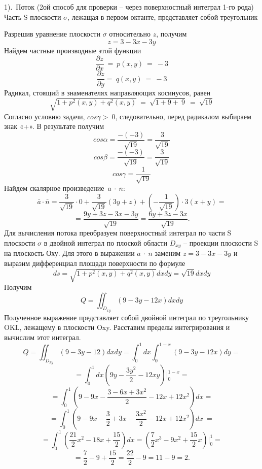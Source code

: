 \documentclass[11pt]{article}
\begin{document}
 
\pagestyle{empty}
1).\ Поток (2ой способ для проверки – через поверхностный интеграл 1-го рода)
Часть S плоскости $\sigma$, лежащая в первом октанте, представляет собой треугольник \\


Разрешив уравнение плоскости $\sigma$ относительно $z$, получим 
$$z=3 - 3x - 3y$$
Найдем частные производные этой функции
$$\frac{\partial z}{\partial x}\ =\ p(x,y)\ =\ -3$$
$$\frac{\partial z}{\partial y}=\ q(x,y)\ =\ -3$$
Радикал, стоящий в знаменателях направляющих косинусов, равен
$$\sqrt{1+p^2\left(x,y\right)+q^2\left(x,y\right)}\ =\ \sqrt{1+9+\ 9}\ =\ \sqrt{19}$$
Согласно условию задачи, $cos\gamma>\ 0$, следовательно, перед радикалом выбираем знак «+». В результате получим 
$$cos\alpha=\frac{-\left(-3\right)}{\sqrt{19}}=\frac{3}{\sqrt{19}}$$
$$cos\beta=\frac{-\left(-3\right)}{\sqrt{19}}=\frac{3}{\sqrt{19}}$$
$$cos\gamma=\frac{1}{\sqrt{19}}$$
Найдем скалярное произведение\ $\bar{a}\ \cdot\ \bar{n}$:
$$\bar{a}\cdot \bar{n}=\frac{3}{\sqrt{19}}\cdot0+\frac{3}{\sqrt{19}}\left(3y+z\right)+\left(-\frac{1}{\sqrt{19}}\right)\cdot3\left(x+y\right)=$$
$$=\frac{9y+3z-3x-3y}{\sqrt{19}}=\frac{6y+3z-3x}{\sqrt{19}}.$$
Для вычисления потока преобразуем поверхностный интеграл по части S плоскости $\sigma$ в двойной интеграл по плоской области $D_{xy}$ – проекции плоскости S на плоскость Оху. Для этого в выражении  $\bar{a}\ \cdot\ \bar{n}$ заменим $z = 3 - 3x - 3y$ и выразим дифференциал площади поверхности по формуле
$$ds=\sqrt{1+p^2\left(x,y\right)+q^2\left(x,y\right)}dxdy=\sqrt{19}dxdy$$
Получим $$Q = \iint_{D_{xy}}{(9-3y-12x)}dxdy$$
Полученное выражение представляет собой двойной интеграл по треугольнику OKL, лежащему в плоскости Oxy. Расставим пределы интегрирования и вычислим этот интеграл.
$$
Q=\iint_{D_{xy}}\left(9-3y-12\right)dxdy=\int_{0}^{1}{dx\int_{0}^{1-x}\left(9-3y-12x\right)dy}=$$
$$=\int_{0}^{1}{dx\left(9y-\frac{3y^2}{2}-12xy\right)\Bigg|_0^{1-x}}=$$
$$=\int_{0}^{1}\left(9-9x-\frac{3-6x+3x^2}{2}-12x+12x^2\right)dx=$$
$$=\int_{0}^{1}\left(9-9x-\frac{3}{2}+3x-\frac{3x^2}{2}-12x+12x^2\right)dx\ =$$
$$=\int_{0}^{1}\left(\frac{21}{2}x^2-18x+\frac{15}{2}\right)dx=\left(\frac{7}{2}x^3-9x^2+\frac{15}{2}x\right)\Bigg|_0^1=$$
$$=\frac{7}{2}-9+\frac{15}{2}=\frac{22}{2}-9=11-9=2.$$
\end{document}
